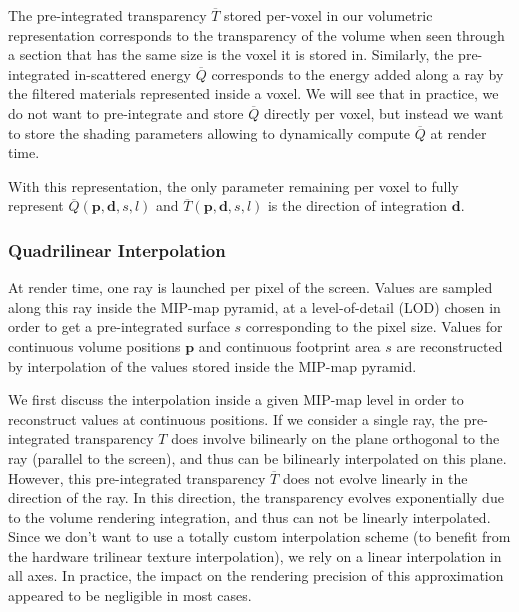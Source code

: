 The pre-integrated transparency $\overline{T}$ stored per-voxel in our volumetric representation corresponds to the transparency of the volume when seen through a section that has the same size is the voxel it is stored in. Similarly, the pre-integrated in-scattered energy $\overline{Q}$ corresponds to the energy added along a ray by the filtered materials represented inside a voxel. We will see that in practice, we do not want to pre-integrate and store $\overline{Q}$ directly per voxel, but instead we want to store the shading parameters allowing to dynamically compute $\overline{Q}$ at render time.

With this representation, the only parameter remaining per voxel to fully represent $\overline{Q}(\mathbf{p},\mathbf{d},s,l)$ and $\overline{T}(\mathbf{p},\mathbf{d},s,l)$ is the direction of integration $\mathbf{d}$.



\subsubsection{Quadrilinear Interpolation}
At render time, one ray is launched per pixel of the screen. Values are sampled along this ray inside the MIP-map pyramid, at a level-of-detail (LOD) chosen in order to get a pre-integrated surface $s$ corresponding to the pixel size. Values for continuous volume positions $\mathbf{p}$ and continuous footprint area $s$  are reconstructed by interpolation of the values stored inside the MIP-map pyramid. 

We first discuss the interpolation inside a given MIP-map level in order to reconstruct values at continuous positions. If we consider a single ray, the pre-integrated transparency $T$ does involve bilinearly on the plane orthogonal to the ray (parallel to the screen), and thus can be bilinearly interpolated on this plane. However, this pre-integrated transparency $\overline{T}$ does not evolve linearly in the direction of the ray. In this direction, the transparency evolves exponentially due to the volume rendering integration, and thus can not be linearly interpolated. Since we don't want to use a totally custom interpolation scheme (to benefit from the hardware trilinear texture interpolation), we rely on a linear interpolation in all axes. In practice, the impact on the rendering precision of this approximation appeared to be negligible in most cases.

